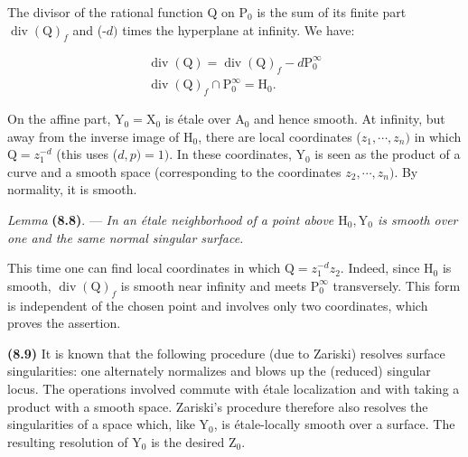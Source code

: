 \documentclass[10pt,leqno]{article}
\begin{document}
\noindent The divisor of the rational function \(\mathrm{Q}\) on \(\mathrm{P}_{0}\) is the sum of its finite part \(\operatorname{div}(\mathrm{Q})_{f}\) and (-\(d)\) times the hyperplane at infinity. We have:\par

\begin{equation*}\begin{gathered}\operatorname{div}(\mathrm{Q}) = \operatorname{div}(\mathrm{Q})_{f} - d\mathrm{P}_{0}^{\infty } \\ \operatorname{div}(\mathrm{Q})_{f} \cap  \mathrm{P}_{0}^{\infty } = \mathrm{H}_{0}.\end{gathered}\tag{8.7.1}\end{equation*}

\noindent On the affine part, \(\mathrm{Y}_{0} = \mathrm{X}_{0}\) is étale over \(\mathrm{A}_{0}\) and hence smooth. At infinity, but away from the inverse image of \(\mathrm{H}_{0}\), there are local coordinates (\(z_{1},\cdots ,z_{n})\) in which \(\mathrm{Q} = z_{1}^{-d}\) (this uses (\(d,p) = 1)\). In these coordinates, \(\mathrm{Y}_{0}\) is seen as the product of a curve and a smooth space (corresponding to the coordinates \(z_{2},\cdots ,z_{n})\). By normality, it is smooth.\par

\noindent \emph{Lemma} \textbf{(8.8)}. — {\itshape In an étale neighborhood of a point above \(\mathrm{H}_{0}, \mathrm{Y}_{0}\) is smooth over one and the same normal singular surface.}\par

\noindent This time one can find local coordinates in which \(\mathrm{Q} = z_{1}^{-d}z_{2}\). Indeed, since \(\mathrm{H}_{0}\) is smooth, \(\operatorname{div}(\mathrm{Q})_{f}\) is smooth near infinity and meets \(\mathrm{P}_{0}^{\infty }\) transversely. This form is independent of the chosen point and involves only two coordinates, which proves the assertion.\par

\noindent \textbf{(8.9)} It is known that the following procedure (due to Zariski) resolves surface singularities: one alternately normalizes and blows up the (reduced) singular locus. The operations involved commute with étale localization and with taking a product with a smooth space. Zariski’s procedure therefore also resolves the singularities of a space which, like \(\mathrm{Y}_{0}\), is étale-locally smooth over a surface. The resulting resolution of \(\mathrm{Y}_{0}\) is the desired \(\mathrm{Z}_{0}\).\par
\end{document}
